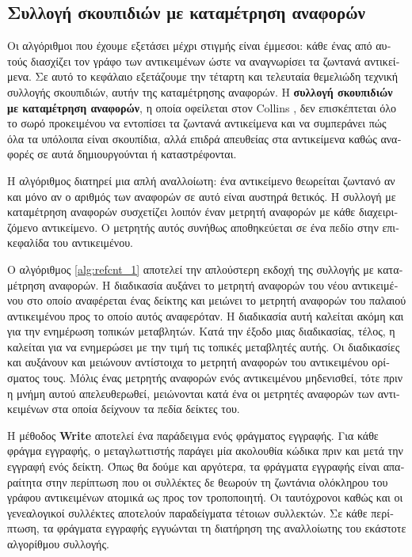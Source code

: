 \begin{greek}
\chapter{Συλλογή σκουπιδιών με καταμέτρηση αναφορών}\label{ch:refcnt}
Οι αλγόριθμοι που έχουμε εξετάσει μέχρι στιγμής είναι έμμεσοι:
κάθε ένας από αυτούς διασχίζει τον γράφο των αντικειμένων
ώστε να αναγνωρίσει τα ζωντανά αντικείμενα. Σε αυτό το κεφάλαιο
εξετάζουμε την τέταρτη και τελευταία θεμελιώδη τεχνική συλλογής
σκουπιδιών, αυτήν της καταμέτρησης αναφορών.  
Η \textbf{συλλογή σκουπιδιών με καταμέτρηση αναφορών}, η
οποία οφείλεται στον Collins \cite{DBLP:journals/cacm/Collins60},
δεν επισκέπτεται όλο το σωρό προκειμένου να εντοπίσει τα
ζωντανά αντικείμενα και να συμπεράνει πώς όλα τα υπόλοιπα
είναι σκουπίδια, αλλά επιδρά απευθείας στα αντικείμενα
καθώς αναφορές σε αυτά δημιουργούνται ή καταστρέφονται.

Η αλγόριθμος διατηρεί μια απλή αναλλοίωτη: ένα αντικείμενο
θεωρείται ζωντανό αν και μόνο αν ο αριθμός των αναφορών σε
αυτό είναι αυστηρά θετικός. Η συλλογή με καταμέτρηση αναφορών
συσχετίζει λοιπόν έναν μετρητή αναφορών με κάθε διαχειριζόμενο
αντικείμενο. Ο μετρητής αυτός συνήθως αποθηκεύεται σε ένα
πεδίο στην  επικεφαλίδα του αντικειμένου.

Ο αλγόριθμος \ref{alg:refcnt_1} αποτελεί την απλούστερη
εκδοχή της συλλογής με καταμέτρηση αναφορών. Η διαδικασία
 αυξάνει το μετρητή αναφορών του νέου
αντικειμένου στο οποίο αναφέρεται ένας δείκτης και μειώνει
το μετρητή αναφορών του παλαιού αντικειμένου προς το οποίο
αυτός αναφερόταν. Η διαδικασία αυτή καλείται ακόμη και για
την ενημέρωση τοπικών μεταβλητών. Κατά την έξοδο μιας
διαδικασίας, τέλος, η  καλείται για να
ενημερώσει με την τιμή \null τις τοπικές μεταβλητές αυτής.
Οι διαδικασίες  και 
αυξάνουν και μειώνουν αντίστοιχα το μετρητή αναφορών του
αντικειμένου ορίσματος τους. Μόλις ένας μετρητής αναφορών
ενός αντικειμένου μηδενισθεί, τότε πριν η μνήμη αυτού
απελευθερωθεί, μειώνονται κατά ένα οι μετρητές αναφορών
των αντικειμένων στα οποία δείχνουν τα πεδία δείκτες
του.

Η μέθοδος \textbf{Write} αποτελεί ένα παράδειγμα ενός φράγματος
εγγραφής. Για κάθε φράγμα εγγραφής, ο μεταγλωττιστής παράγει
μία ακολουθία κώδικα πριν και μετά την εγγραφή ενός δείκτη.
Όπως θα δούμε και αργότερα, τα φράγματα εγγραφής είναι
απαραίτητα στην περίπτωση που οι συλλέκτες δε θεωρούν τη
ζωντάνια ολόκληρου του γράφου αντικειμένων ατομικά ως προς
τον τροποποιητή. Οι ταυτόχρονοι καθώς και οι γενεαλογικοί
συλλέκτες αποτελούν παραδείγματα τέτοιων συλλεκτών. Σε κάθε
περίπτωση, τα φράγματα εγγραφής εγγυώνται τη διατήρηση της
αναλλοίωτης του εκάστοτε αλγορίθμου συλλογής.


\end{greek}
